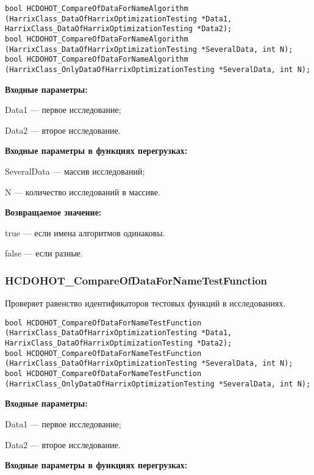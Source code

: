 \documentclass[a4paper,12pt]{article}
\begin{document}
\begin{lstlisting}[label=code_syntax_HCDOHOT_CompareOfDataForNameAlgorithm,caption=Синтаксис]
bool HCDOHOT_CompareOfDataForNameAlgorithm (HarrixClass_DataOfHarrixOptimizationTesting *Data1, HarrixClass_DataOfHarrixOptimizationTesting *Data2);
bool HCDOHOT_CompareOfDataForNameAlgorithm (HarrixClass_DataOfHarrixOptimizationTesting *SeveralData, int N);
bool HCDOHOT_CompareOfDataForNameAlgorithm (HarrixClass_OnlyDataOfHarrixOptimizationTesting *SeveralData, int N);
\end{lstlisting}

\textbf{Входные параметры:}

Data1 --- первое исследование;

Data2 --- второе исследование.

\textbf{Входные параметры в функциях перегрузках:}

SeveralData --- массив исследований;

N --- количество исследований в массиве.

\textbf{Возвращаемое значение:}

true --- если имена алгоритмов одинаковы.

false --- если разные.


\subsubsection{HCDOHOT\_CompareOfDataForNameTestFunction}\label{HCDOHOT_CompareOfDataForNameTestFunction}

Проверяет равенство идентификаторов тестовых функций в исследованиях.


\begin{lstlisting}[label=code_syntax_HCDOHOT_CompareOfDataForNameTestFunction,caption=Синтаксис]
bool HCDOHOT_CompareOfDataForNameTestFunction (HarrixClass_DataOfHarrixOptimizationTesting *Data1, HarrixClass_DataOfHarrixOptimizationTesting *Data2);
bool HCDOHOT_CompareOfDataForNameTestFunction (HarrixClass_DataOfHarrixOptimizationTesting *SeveralData, int N);
bool HCDOHOT_CompareOfDataForNameTestFunction (HarrixClass_OnlyDataOfHarrixOptimizationTesting *SeveralData, int N);
\end{lstlisting}

\textbf{Входные параметры:}

Data1 --- первое исследование;

Data2 --- второе исследование.

\textbf{Входные параметры в функциях перегрузках:}
\end{document}
